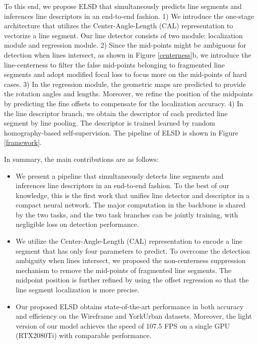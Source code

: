 \documentclass[10pt,twocolumn,letterpaper]{article}
\begin{document}
To this end, we propose ELSD that simultaneously predicts line segments and inferences line descriptors in an end-to-end fashion. 1) We introduce the one-stage architecture that utilizes the Center-Angle-Length (CAL) representation to vectorize a line segment. Our line detector consists of two module:  localization module and  regression module. 2) Since the mid-points might be ambiguous for detection when lines intersect, as shown in Figure \ref{centerness}b, we introduce the line-centerness to filter the false mid-points belonging to fragmented line segments and adopt modified focal loss\cite{Focal} to focus more on the mid-points of hard cases. 3) In the regression module, the geometric maps are predicted to provide the rotation angles and lengths. Moreover, we refine the position of the midpoints by predicting the fine offsets to compensate for the localization accuracy. 4) In the line descriptor branch, we obtain the descriptor of each predicted line segment by line pooling. The descriptor is trained learned by random homography-based self-supervision. The pipeline of ELSD is shown in Figure \ref{framework}.



In summary, the main contributions are as follows:


\begin{itemize}
\item We present a pipeline that simultaneously detects line segments and inferences line descriptors in an end-to-end fashion. To the best of our knowledge, this is the first work that unifies line detector and descriptor in a compact neural network. The major computation in the backbone is shared by the two tasks, and the two task branches can be jointly training, with negligible loss on detection performance.

\item We utilize the Center-Angle-Length (CAL) representation to encode a line segment that has only four parameters to predict. To overcome the detection ambiguity when lines intersect, we proposed the non-centerness suppression mechanism to remove the mid-points of fragmented line segments. The midpoint position is further refined by using the offset regression so that the line segment localization is more precise.

\item Our proposed ELSD obtains state-of-the-art performance in both accuracy and efficiency on the Wireframe and YorkUrban datasets. Moreover, the light version of our model achieves the speed of 107.5 FPS on a single GPU (RTX2080Ti) with comparable performance.




\end{itemize}
\end{document}
